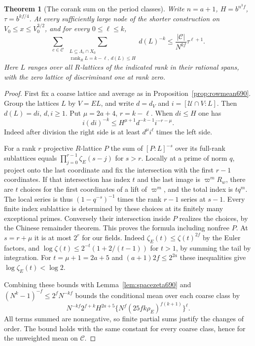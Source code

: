 \documentclass[a4paper,11pt]{article}
\newtheorem{theorem}[proposition]{Theorem}
\theoremstyle{definition}
\theoremstyle{remark}
\numberwithin{equation}{section}
\begin{document}
\begin{theorem}[The corank sum on the period classes]
\leavevmode\label{thm:latticemean690}
Write \(n=a+1\), \(H=b^{n^3 f}\), \(\tau=b^{kf/4}\). At
every sufficiently large node of the shorter construction
on \(V_0\le x\le V_0^{3/2}\), and for every \(0\le\ell\le k\),
\[
  \sum_{c\in\mathcal C}
    \ \sum_{\substack{L\subseteq\Lambda_{c}\cap X_0\\
                  \operatorname{rank}_R L=k-\ell,\ d(L)\le H}}
               d(L)^{-k}
          \le \frac{|\mathcal C|}{N^{kf}}\tau^{\ell+1}.
\]
Here \(L\) ranges over all \(R\)-lattices of the indicated rank
in their rational spans, with the zero lattice of discriminant
one at rank zero.
\end{theorem}
\begin{proof}
First fix a coarse lattice and average as in
Proposition~\ref{prop:rowmean690}. Group the lattices \(L\)
by \(V=EL\), and write \(d=d_V\) and \(i=[\mathcal U\cap V:L]\).
Then \(d(L)=di\), \(d,i\ge1\). Put \(\mu=2a+4\),
\(r=k-\ell\). When \(di\le H\) one has
\[
    i(di)^{-k}\le H^{\mu+1} d^{-k-1}i^{-r-\mu}.
\]
Indeed after division the right side is at least
\(d^\mu i^\ell\) times the left side.

For a rank \(r\) projective \(R\)-lattice \(P\) the sum of
\([P:L]^{-s}\) over its full-rank sublattices equals
\(\prod_{j=0}^{r-1}\zeta_E(s-j)\) for \(s>r\). Locally at
a prime of norm \(q\), project onto the last coordinate and
fix the intersection with the first \(r-1\) coordinates.
If that intersection has index \(t\) and the last image
is \(\varpi^m R_w\), there are \(t\) choices for the first
coordinates of a lift of \(\varpi^m\), and the total index
is \(tq^m\). The local series is thus \((1-q^{-s})^{-1}\)
times the rank \(r-1\) series at \(s-1\).
Every finite index sublattice is determined by these choices
at its finitely many exceptional primes. Conversely their
intersection inside \(P\) realizes the choices, by the
Chinese remainder theorem. This proves the formula including
nonfree \(P\). At \(s=r+\mu\) it is at most \(2^r\) for our
fields. Indeed \(\zeta_E(t)\le\zeta(t)^{2f}\) by the Euler
factors, and
\(\log\zeta(t)\le 2^{-t}(1+2/(t-1))\) for \(t>1\), by
summing the tail by integration. For \(t=\mu+1=2a+5\) and
\((a+1)2f\le2^{2a}\) these inequalities give
\(\log\zeta_E(t)<\log2\).

Combining these bounds with Lemma~\ref{lem:spacezeta690}
and \((N^k-1)^{-f}\le 2^f N^{-kf}\) bounds the conditional
mean over each coarse class by
\[
    N^{-kf} 2^{f+k} H^{2a+5}
        \big\{N^f(25 f k\rho_E)^{f(k+1)}\big\}^{\ell}.
\]
All terms summed are nonnegative, so finite partial sums
justify the changes of order. The bound holds with the same
constant for every coarse class, hence for the unweighted
mean on \(\mathcal C\).


\end{proof}
\end{document}
